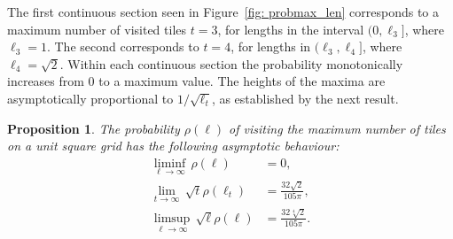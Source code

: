 \documentclass[12pt, a4paper]{article}
\newcommand{\probmax}{\rho} %
\newcommand{\len}{\ell} %
\newcommand{\tiles}{t} %
\newtheorem{proposition}{Proposition}%
\begin{document}
The first continuous section seen in Figure~\ref{fig: probmax_len} corresponds to a maximum number of visited tiles $\tiles=3$, for lengths in the interval $(0, \len_3]$, where $\len_3= 1$. The second corresponds to $\tiles=4$, for lengths in $(\len_3, \len_4]$, where $\len_4= \sqrt{2}$. Within each continuous section the probability monotonically increases from $0$ to a maximum value. The heights of the maxima are asymptotically proportional to $1/\sqrt{\len_\tiles}$, as established by the next result.

\begin{proposition}
The probability $\probmax(\len)$ of visiting the maximum number of tiles on a unit square grid has the following asymptotic behaviour:
\begin{align}
\label{eq: probmax liminf}
\liminf_{\len \rightarrow \infty}\, \probmax(\len) & = 0, \\ 
\label{eq: probmax lim sqrt tiles}
\lim_{\tiles \rightarrow \infty}\, \sqrt{\tiles} \probmax(\len_\tiles) & = \frac {32\sqrt{2}}{105\pi}, \\
\label{eq: probmax limsup sqrt len}
\limsup_{\len \rightarrow \infty}\, \sqrt{\len} \probmax(\len) & = \frac {32\sqrt[4]{2}}{105\pi}.
\end{align}
\end{proposition}
\end{document}
